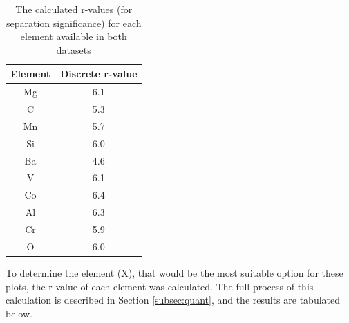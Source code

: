 \documentclass[fleqn,usenatbib]{mnras}
\begin{document}
\begin{center}
\begin{table}
    \centering
    \begin{tabular}{ |c|c| } 
         \hline
         Element & {Discrete r-value} \\ 
         \hline\hline
          Mg & 6.1  \\ 
         \hline
         C & 5.3  \\ 
         \hline
         Mn & 5.7 \\
        \hline
         Si & 6.0 \\
         \hline
         Ba & 4.6 \\
         \hline
         V & 6.1 \\
         \hline
         Co & 6.4 \\
         \hline
         Al & 6.3 \\
         \hline
         Cr & 5.9 \\
         \hline
         O & 6.0 \\
         \hline
    \end{tabular}
    \caption{The calculated r-values (for separation significance) for each element available in both datasets}
    \label{table: 1}
\end{table}
\end{center}

To determine the element (X), that would be the most suitable option for these plots, the r-value of each element was calculated. The full process of this calculation is described in Section \ref{subsec:quant}, and the results are tabulated below. 
\end{document}
